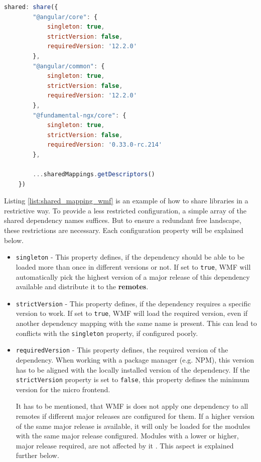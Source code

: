 \begin{lstlisting}[language=JavaScript, caption=Example of sharing dependencies configured in the \texttt{webpack.config.js}, label=list:shared_mapping_wmf,  xleftmargin=.0\textwidth, xrightmargin=.0\textwidth]
	shared: share({
		"@angular/core": { 
			singleton: true, 
			strictVersion: false, 
			requiredVersion: '12.2.0' 
		},
		"@angular/common": { 
			singleton: true, 
			strictVersion: false, 
			requiredVersion: '12.2.0' 
		},
		"@fundamental-ngx/core": { 
			singleton: true, 
			strictVersion: false, 
			requiredVersion: '0.33.0-rc.214' 
		},
		
		...sharedMappings.getDescriptors()
	})
\end{lstlisting}

Listing \ref{list:shared_mapping_wmf} is an example of how to share libraries in a restrictive way. To provide a less restricted configuration, a simple array of the shared dependency names suffices. But to ensure a redundant free landscape, these restrictions are necessary. Each configuration property will be explained below.

\begin{itemize}
	\item \texttt{singleton} - This property defines, if the dependency should be able to be loaded more than once in different versions or not. If set to \texttt{true}, WMF will automatically pick the highest version of a major release of this dependency available and distribute it to the \textbf{remotes}.\cite{wmf_version_mismatch}
	
	\item \texttt{strictVersion} - This property defines, if the dependency requires a specific version to work. If set to \texttt{true}, WMF will load the required version, even if another dependency mapping with the same name is present. This can lead to conflicts with the \texttt{singleton} property, if configured poorly.
	
	\item \texttt{requiredVersion} - This property defines, the required version of the dependency. When working with a package manager (e.g. NPM), this version has to be aligned with the locally installed version of the dependency. If the \texttt{strictVersion} property is set to \texttt{false}, this property defines the minimum version for the micro frontend. 
	
	It has to be mentioned, that WMF is does not apply one dependency to all remotes if different major releases are configured for them. If a higher version of the same major release is available, it will only be loaded for the modules with the same major release configured. Modules with a lower or higher, major release required, are not affected by it \cite{wmf_multi_versions}. This aspect is explained further below.
\end{itemize}

